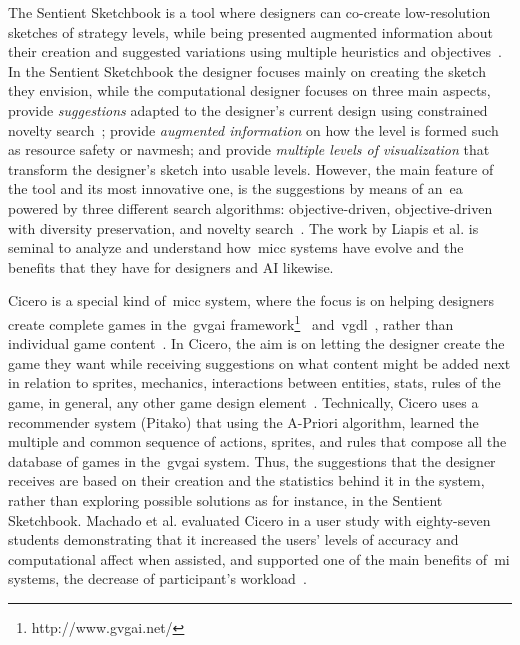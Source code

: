 The Sentient Sketchbook is a tool where designers can co-create low-resolution sketches of strategy levels, while being presented augmented information about their creation and suggested variations using multiple heuristics and objectives~\cite{Liapis2013-sentientsketchbook}. In the Sentient Sketchbook the designer focuses mainly on creating the sketch they envision, while the computational designer focuses on three main aspects, provide \textit{suggestions} adapted to the designer's current design using constrained novelty search~\cite{liapis2015-ConstrainedNoveltySearch}; provide \textit{augmented information} on how the level is formed such as resource safety or navmesh; and provide \textit{multiple levels of visualization} that transform the designer's sketch into usable levels. However, the main feature of the tool and its most innovative one, is the suggestions by means of an~\acrshort{ea} powered by three different search algorithms: objective-driven, objective-driven with diversity preservation, and novelty search~\cite{preuss2014-gooddiverseLVL}. The work by Liapis et al. is seminal to analyze and understand how~\acrshort{micc} systems have evolve and the benefits that they have for designers and AI likewise.

Cicero is a special kind of~\acrshort{micc} system, where the focus is on helping designers create complete games in the~\acrfull{gvgai} framework\footnote{http://www.gvgai.net/}~\cite{gvgaibook2019} and~\acrfull{vgdl}~\cite{Schaul2013-vgdl}, rather than individual game content~\cite{Machado2017}. In Cicero, the aim is on letting the designer create the game they want while receiving suggestions on what content might be added next in relation to sprites, mechanics, interactions between entities, stats, rules of the game, in general, any other game design element~\cite{machado2019pitako}. Technically, Cicero uses a recommender system (Pitako) that using the A-Priori algorithm, learned the multiple and common sequence of actions, sprites, and rules that compose all the database of games in the~\acrshort{gvgai} system. Thus, the suggestions that the designer receives are based on their creation and the statistics behind it in the system, rather than exploring possible solutions as for instance, in the Sentient Sketchbook. Machado et al. evaluated Cicero in a user study with eighty-seven students demonstrating that it increased the users' levels of accuracy and computational affect when assisted, and supported one of the main benefits of~\acrshort{mi} systems, the decrease of participant's workload~\cite{machado2019evaluation}.

